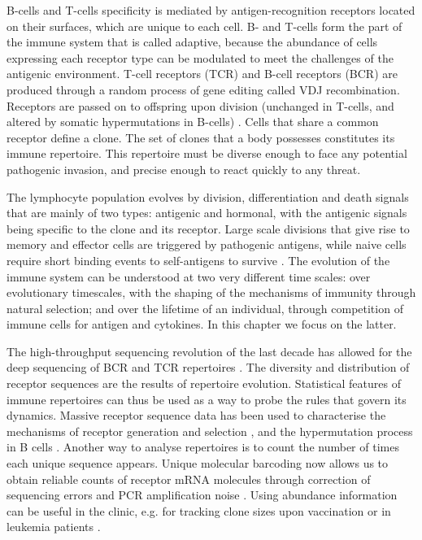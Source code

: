\documentclass[aps,pre,twocolumn,superscriptaddress,groupedaddress]{revtex4}
\newcommand{\<}{\langle}
\renewcommand{\>}{\rangle}
\begin{document}
B-cells and T-cells specificity is mediated by antigen-recognition receptors located on their surfaces, which are unique to each cell. B- and T-cells form the part of the immune system that is called adaptive, because the abundance of cells expressing each receptor type can be modulated to meet the challenges of the antigenic environment. T-cell receptors (TCR) and B-cell receptors (BCR) are produced through a random process of gene editing called VDJ recombination. {Receptors are passed on to offspring upon division (unchanged in T-cells, and altered by somatic hypermutations in B-cells)} \cite{Janeway}. Cells that share a common receptor define a clone. The set of clones that a body possesses constitutes its immune repertoire. This repertoire must be diverse enough to face any potential pathogenic invasion, and precise enough to react quickly to any threat.
 
The lymphocyte population evolves by division, differentiation and death signals that are mainly of two types: antigenic and hormonal, with the antigenic signals being specific to the clone and its receptor. Large scale divisions that give rise to memory and effector cells are triggered by pathogenic antigens, while naive cells require short binding events to self-antigens to survive \cite{Troy2003, mak2006immune}. The evolution of the immune system can be understood at two very different time scales: over evolutionary timescales, with the shaping of the mechanisms of immunity through natural selection; and over the lifetime of an individual, through competition of immune cells for antigen and cytokines. In this chapter we focus on the latter.

The high-throughput sequencing revolution of the last decade has allowed for the deep sequencing of {BCR and TCR repertoires} \cite{Weinstein2009,Boyd2009a,Robins2009,friedman-2012, chain-2014, greenberg-2012, robins-2011, mamedov-2014, Warren2011}. The diversity and distribution of receptor sequences are the results of repertoire evolution. {Statistical features of immune repertoires can thus} be used as a way to probe the rules that govern its dynamics. Massive receptor sequence data has been used to characterise the mechanisms of receptor generation and selection \cite{murugan-2012,walczak-2014}, and the hypermutation process in B cells \cite{Yaari2013a,Elhanati2015,Mccoy2015}.
Another way to analyse repertoires is to count the number of times each unique sequence appears. Unique molecular barcoding now allows {us to obtain reliable} counts of receptor mRNA molecules through correction of sequencing errors and PCR amplification noise \cite{Vollmers2013,Best2015b,Shugay2014a}.
Using abundance information can be useful in the clinic, e.g. for tracking clone sizes upon vaccination \cite{Vollmers2013,Laserson2014,chain-2014,Galson2014} or in leukemia patients \cite{Wu2012,Salson2016}.
\end{document}
